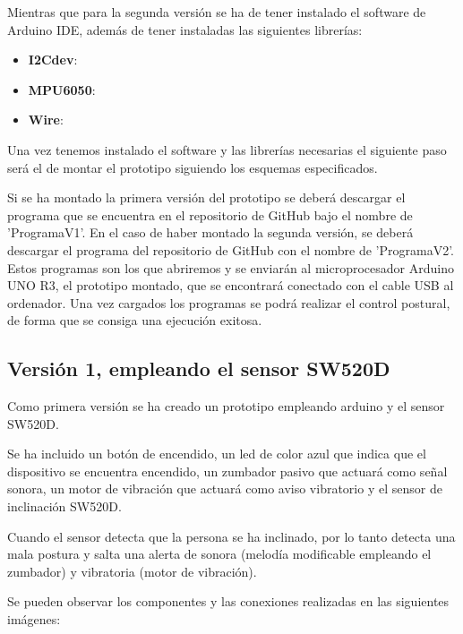 Mientras que para la segunda versión se ha de tener instalado el software de Arduino IDE\cite{Arduino1,Arduino2}, además de tener instaladas las siguientes librerías:
\begin{itemize}
    \item \textbf{I2Cdev}:
    \item \textbf{MPU6050}:
    \item \textbf{Wire}: 
\end{itemize}

Una vez tenemos instalado el software y las librerías necesarias el siguiente paso será el de montar el prototipo siguiendo los esquemas especificados.

Si se ha montado la primera versión del prototipo se deberá descargar el programa que se encuentra en el repositorio de GitHub bajo el nombre de 'ProgramaV1'. En el caso de haber montado la segunda versión, se deberá descargar el programa del repositorio de GitHub con el nombre de 'ProgramaV2'. Estos programas son los que abriremos y se enviarán al microprocesador Arduino UNO R3, el prototipo montado, que se encontrará conectado con el cable USB al ordenador. Una vez cargados los programas se podrá realizar el control postural, de forma que se consiga una ejecución exitosa.


\subsection{Versión 1, empleando el sensor SW520D}
Como primera versión se ha creado un prototipo empleando arduino y el sensor SW520D\cite{SW520D_1}.

Se ha incluido un botón de encendido, un led de color azul que indica que el dispositivo se encuentra encendido, un zumbador pasivo que actuará como señal sonora, un motor de vibración que actuará como aviso vibratorio y el sensor de inclinación SW520D.

Cuando el sensor detecta que la persona se ha inclinado, por lo tanto detecta una mala postura y salta una alerta de sonora (melodía modificable empleando el zumbador) y vibratoria (motor de vibración).

Se pueden observar los componentes y las conexiones realizadas en las siguientes imágenes:

